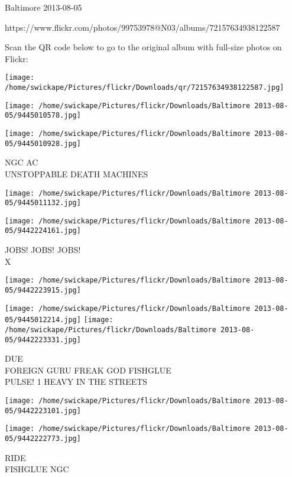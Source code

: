 \documentclass[10pt,letterpaper]{article}
\begin{document}
Baltimore 2013-08-05

https://www.flickr.com/photos/99753978@N03/albums/72157634938122587

Scan the QR code below to go to the original album with full-size photos on Flickr:

\texttt{[image: /home/swickape/Pictures/flickr/Downloads/qr/72157634938122587.jpg]}
\pagebreak

\texttt{[image: /home/swickape/Pictures/flickr/Downloads/Baltimore 2013-08-05/9445010578.jpg]}

\vspace{0.25in}
\texttt{[image: /home/swickape/Pictures/flickr/Downloads/Baltimore 2013-08-05/9445010928.jpg]}

NGC AC\\
UNSTOPPABLE DEATH MACHINES\\
\pagebreak

\texttt{[image: /home/swickape/Pictures/flickr/Downloads/Baltimore 2013-08-05/9445011132.jpg]}

\vspace{0.25in}
\texttt{[image: /home/swickape/Pictures/flickr/Downloads/Baltimore 2013-08-05/9442224161.jpg]}

JOBS! JOBS! JOBS!\\
X\\
\pagebreak

\texttt{[image: /home/swickape/Pictures/flickr/Downloads/Baltimore 2013-08-05/9442223915.jpg]}

\vspace{0.25in}
\texttt{[image: /home/swickape/Pictures/flickr/Downloads/Baltimore 2013-08-05/9445012214.jpg]}
\texttt{[image: /home/swickape/Pictures/flickr/Downloads/Baltimore 2013-08-05/9442223331.jpg]}

DUE\\
FOREIGN GURU FREAK GOD FISHGLUE\\
PULSE! 1 HEAVY IN THE STREETS\\
\pagebreak

\texttt{[image: /home/swickape/Pictures/flickr/Downloads/Baltimore 2013-08-05/9442223101.jpg]}

\vspace{0.25in}
\texttt{[image: /home/swickape/Pictures/flickr/Downloads/Baltimore 2013-08-05/9442222773.jpg]}

RIDE\\
FISHGLUE NGC\\
\pagebreak
\end{document}
